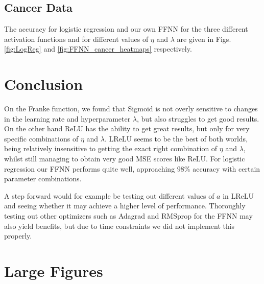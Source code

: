 \documentclass[%
reprint,
amsmath,amssymb,
aps,
]{revtex4-2}
\begin{document}
\subsection{Cancer Data}
The accuracy for logistic regression and our own FFNN for the three different activation functions and for different values of $\eta$ and $\lambda$ are given in Figs. \ref{fig:LogReg} and \ref{fig:FFNN_cancer_heatmaps} respectively.

\section{Conclusion}
On the Franke function, we found that Sigmoid is not overly sensitive to changes in the learning rate and hyperparameter $\lambda$, but also struggles to get good results. On the other hand ReLU has the ability to get great results, but only for very specific combinations of $\eta$ and $\lambda$. LReLU seems to be the best of both worlds, being relatively insensitive to getting the exact right combination of $\eta$ and $\lambda$, whilst still managing to obtain very good MSE scores like ReLU.  For logistic regression our FFNN performs quite well, approaching $98\%$ accuracy with certain parameter combinations.

A step forward would for example be testing out different values of $a$ in LReLU and seeing whether it may achieve a higher level of performance. Thoroughly testing out other optimizers such as Adagrad and RMSprop for the FFNN may also yield benefits, but due to time constraints we did not implement this properly. 




\appendix
\section{Large Figures}
\label{Appendix:A}
\end{document}
